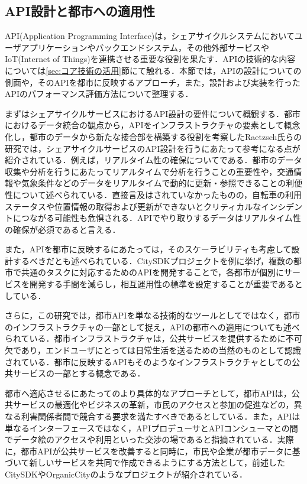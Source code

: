   \subsection{API設計と都市への適用性}
    \label{sec:API設計と都市への適用性}
      \par API(Application Programming Interface)は，シェアサイクルシステムにおいてユーザアプリケーションやバックエンドシステム，その他外部サービスやIoT(Internet of Things)を連携させる重要な役割を果たす．APIの技術的な内容については\ref{sec:コア技術の活用}節にて触れる．本節では，APIの設計についての側面や，そのAPIを都市に反映するアプローチ，また，設計および実装を行ったAPIのパフォーマンス評価方法について整理する．
      \par まずはシェアサイクルサービスにおけるAPI設計の要件について概観する．都市におけるデータ統合の観点から，APIをインフラストラクチャの要素として概念化し，都市のデータから新たな接合部を構築する役割を考察したRaetzsch氏らの研究では，シェアサイクルサービスのAPI設計を行うにあたって参考になる点が紹介されている．例えば，リアルタイム性の確保についてである．都市のデータ収集や分析を行うにあたってリアルタイムで分析を行うことの重要性や，交通情報や気象条件などのデータをリアルタイムで動的に更新・参照できることの利便性について述べられている．直接言及はされていなかったものの，自転車の利用ステータスや位置情報の取得および更新ができないとクリティカルなインシデントにつながる可能性も危惧される．APIでやり取りするデータはリアルタイム性の確保が必須であると言える．
      \par また，APIを都市に反映するにあたっては，そのスケーラビリティも考慮して設計するべきだとも述べられている．CitySDKプロジェクトを例に挙げ，複数の都市で共通のタスクに対応するためのAPIを開発することで，各都市が個別にサービスを開発する手間を減らし，相互運用性の標準を設定することが重要であるとしている．
      \par さらに，この研究では，都市APIを単なる技術的なツールとしてではなく，都市のインフラストラクチャの一部として捉え，APIの都市への適用についても述べられている．都市インフラストラクチャは，公共サービスを提供するために不可欠であり，エンドユーザにとっては日常生活を送るための当然のものとして認識されている．都市に反映するAPIもそのようなインフラストラクチャとしての公共サービスの一部とする概念である．
      \par 都市へ適応させるにあたってのより具体的なアプローチとして，都市APIは，公共サービスの最適化やビジネスの革新，市民のアクセスと参加の促進などの，異なる利害関係者間で競合する要求を満たすべきであるとしている．また，APIは単なるインターフェースではなく，APIプロデューサとAPIコンシューマとの間でデータ絵のアクセスや利用といった交渉の場であると指摘されている．実際に，都市APIが公共サービスを改善すると同時に，市民や企業が都市データに基づいて新しいサービスを共同で作成できるようにする方法として，前述したCitySDKやOrganicCityのようなプロジェクトが紹介されている．
